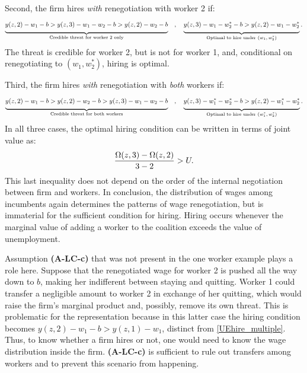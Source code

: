 \noindent Second, the firm hires \emph{with} renegotiation with worker 2 if:
\vspace*{-.3cm}\begin{equation*}
\underbrace{\Big.
y(z,2)-w_1-b>y(z,3)-w_{1}-w_{2}-b >y(z,2)-w_2-b
\Big.}_{\text{Credible threat for worker 2 only}}
\quad,\quad
\underbrace{\Big.
y(z,3)-w_{1}-w_{2}^{\ast}-b>y(z,2)-w_1-w_2^*
\Big.}_{\text{Optimal to hire under $(w_1,w_2^\ast)$}}.
\vspace*{-.3cm}\end{equation*}%
The threat is credible for worker 2, but is not for worker 1, and, conditional on renegotiating to $(w_1,w_2^\ast)$, hiring is optimal.

\noindent Third, the firm hires \emph{with} renegotiation with \emph{both} workers if:
\vspace*{-.3cm}\begin{equation*}
\underbrace{\Big.
y(z,2)-w_1-b>y(z,2)-w_2-b>y(z,3)-w_1-w_2-b
 \Big.}_{\text{Credible threat for both workers}}
\quad,\quad
\underbrace{\Big.
y(z,3)-w_{1}^{\ast}-w_{2}^{\ast}-b>y(z,2)-w_{1}^{\ast}-w_{2}^{\ast}
\Big.}_{\text{Optimal to hire under $(w_1^{\ast},w_2^{\ast})$}}.
\vspace*{-.3cm}\end{equation*}%
In all three cases, the optimal hiring condition can be written in terms of joint value as:
\vspace*{-.3cm}\begin{equation}
\frac{\Omega(z,3)-\Omega(z,2)}{3-2} > U.\label{UEhire_multiple}
\vspace*{-.3cm}\end{equation}
This last inequality does not depend on the order of the internal negotiation between firm and workers. In conclusion, the distribution of wages among incumbents again determines the patterns of wage renegotiation, but is immaterial for the sufficient condition for hiring. Hiring occurs whenever the marginal value of adding a worker to the coalition exceeds the value of unemployment.

Assumption \textbf{(A-LC-c)} that was not present in the one worker example plays a role here. Suppose that the renegotiated wage for worker 2 is pushed all the way down to $b$, making her indifferent between staying and quitting. Worker 1 could transfer a negligible amount to worker 2 in exchange of her quitting, which would raise the firm's marginal product and, possibly, remove its own threat. This is problematic for the representation because in this latter case the hiring condition becomes $y(z,2)-w_{1}-b>y(z,1)-w_{1}$, distinct from \eqref{UEhire_multiple}. Thus, to know whether a firm hires or not, one would need to know the wage distribution inside the firm.  \textbf{(A-LC-c)} is sufficient to rule out transfers among workers and to prevent this scenario from happening.

